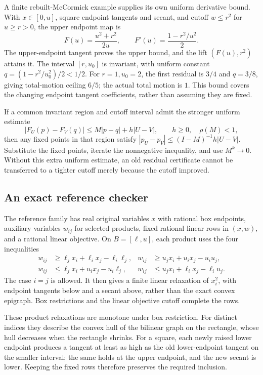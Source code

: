 A finite rebuilt-McCormick example supplies its own uniform derivative
bound. With $x\in[0,u]$, square endpoint tangents and secant, and
cutoff $w\le r^2$ for $u\ge r>0$, the upper endpoint map is
\[
 F(u)=\frac{u^2+r^2}{2u},\qquad
 F'(u)=\frac{1-r^2/u^2}{2}.
\]
The upper-endpoint tangent proves the upper bound, and the lift
$(F(u),r^2)$ attains it. The interval $[r,u_0]$ is invariant, with
uniform constant $q=(1-r^2/u_0^2)/2<1/2$. For $r=1,u_0=2$, the
first residual is $3/4$ and $q=3/8$, giving total-motion ceiling
$6/5$; the actual total motion is $1$. This bound covers the changing
endpoint tangent coefficients, rather than assuming they are fixed.

If a common invariant region and cutoff interval admit the stronger
uniform estimate
\[
 |F_U(p)-F_V(q)|\le M|p-q|+h|U-V|,
 \qquad h\ge0,\quad\rho(M)<1,
\]
then any fixed points in that region satisfy
$|p_U-p_V|\le(I-M)^{-1}h|U-V|$. Substitute the fixed points, iterate
the nonnegative inequality, and use $M^k\to0$. Without this extra
uniform estimate, an old residual certificate cannot be transferred
to a tighter cutoff merely because the cutoff improved.

\subsection{An exact reference checker}

The reference family has real original variables $x$ with rational box
endpoints, auxiliary variables $w_{ij}$ for selected products, fixed rational linear rows in
$(x,w)$, and a rational linear objective. On $B=[\ell,u]$, each product
uses the four inequalities
\begin{align*}
 w_{ij}&\ge\ell_jx_i+\ell_ix_j-\ell_i\ell_j,&
 w_{ij}&\ge u_jx_i+u_ix_j-u_iu_j,\\
 w_{ij}&\le\ell_jx_i+u_ix_j-u_i\ell_j,&
 w_{ij}&\le u_jx_i+\ell_ix_j-\ell_iu_j.
\end{align*}
The case $i=j$ is allowed. It then gives a finite linear relaxation of
$x_i^2$, with endpoint tangents below and a secant above, rather than the
exact convex epigraph. Box restrictions and the linear objective cutoff
complete the rows.

These product relaxations are monotone under box restriction. For
distinct indices they describe the convex hull of the bilinear graph
on the rectangle, whose hull decreases when the rectangle shrinks.
For a square, each newly raised lower endpoint produces a tangent at
least as high as the old lower-endpoint tangent on the smaller interval;
the same holds at the upper endpoint, and the new secant is lower.
Keeping the fixed rows therefore preserves the required inclusion.

